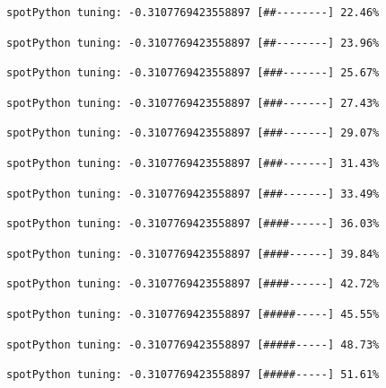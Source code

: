 \documentclass[
  letterpaper,
  DIV=11,
  numbers=noendperiod]{scrreprt}
\begin{document}
\begin{verbatim}
spotPython tuning: -0.3107769423558897 [##--------] 22.46% 
\end{verbatim}

\begin{verbatim}
spotPython tuning: -0.3107769423558897 [##--------] 23.96% 
\end{verbatim}

\begin{verbatim}
spotPython tuning: -0.3107769423558897 [###-------] 25.67% 
\end{verbatim}

\begin{verbatim}
spotPython tuning: -0.3107769423558897 [###-------] 27.43% 
\end{verbatim}

\begin{verbatim}
spotPython tuning: -0.3107769423558897 [###-------] 29.07% 
\end{verbatim}

\begin{verbatim}
spotPython tuning: -0.3107769423558897 [###-------] 31.43% 
\end{verbatim}

\begin{verbatim}
spotPython tuning: -0.3107769423558897 [###-------] 33.49% 
\end{verbatim}

\begin{verbatim}
spotPython tuning: -0.3107769423558897 [####------] 36.03% 
\end{verbatim}

\begin{verbatim}
spotPython tuning: -0.3107769423558897 [####------] 39.84% 
\end{verbatim}

\begin{verbatim}
spotPython tuning: -0.3107769423558897 [####------] 42.72% 
\end{verbatim}

\begin{verbatim}
spotPython tuning: -0.3107769423558897 [#####-----] 45.55% 
\end{verbatim}

\begin{verbatim}
spotPython tuning: -0.3107769423558897 [#####-----] 48.73% 
\end{verbatim}

\begin{verbatim}
spotPython tuning: -0.3107769423558897 [#####-----] 51.61% 
\end{verbatim}
\end{document}
